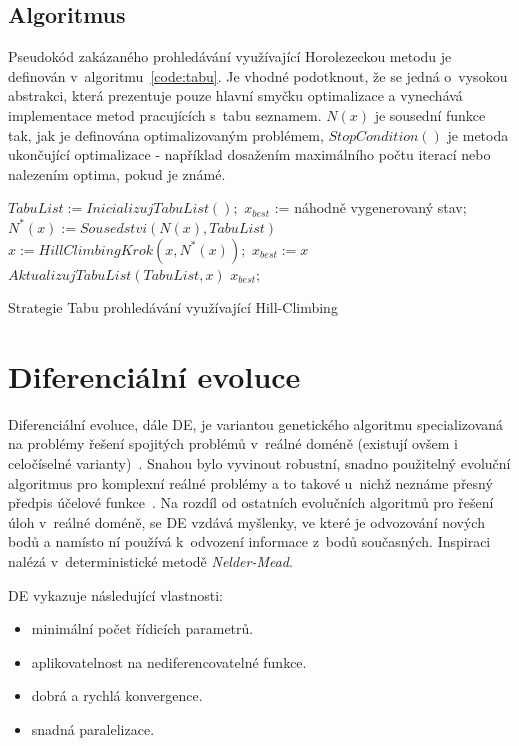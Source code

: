\subsection{Algoritmus}
Pseudokód zakázaného prohledávání využívající Horolezeckou metodu je definován v~algoritmu~\ref{code:tabu}. Je vhodné podotknout, že se jedná o~vysokou abstrakci, která prezentuje pouze hlavní smyčku optimalizace a vynechává implementace metod pracujících s~tabu seznamem. $N(x)$ je sousední funkce tak, jak je definována optimalizovaným problémem, $StopCondition()$ je metoda ukončující optimalizace - například dosažením maximálního počtu iterací nebo nalezením optima, pokud je známé.
\begin{algorithm}[H]
\begin{algorithmic}
\State $TabuList := InicializujTabuList();$ 
\State $x_{best}$ := náhodně vygenerovaný stav;
    \State $N^*(x) := Sousedstvi(N(x), TabuList)$
 	\State $x := HillClimbingKrok(x, N^*(x));$
 	\State $x_{best} := x$
 	\EndIf
 	\State $AktualizujTabuList(TabuList, x)$
\EndWhile
\State \Return $x_{best};$
\end{algorithmic}
\caption{Strategie Tabu prohledávání využívající Hill-Climbing}
\label{code:tabu}
\end{algorithm}


\section{Diferenciální evoluce}
\label{algs:de}
Diferenciální evoluce, dále DE, je variantou genetického algoritmu specializovaná na problémy řešení spojitých problémů v~reálné doméně (existují ovšem i celočíselné varianty)~\cite{Weisser2010}. Snahou bylo vyvinout robustní, snadno použitelný evoluční algoritmus pro komplexní reálné problémy a to takové u~nichž neznáme přesný předpis účelové funkce~\cite{EVO}. Na rozdíl od ostatních evolučních algoritmů pro řešení úloh v~reálné doméně, se DE vzdává myšlenky, ve které je odvozování nových bodů  a namísto ní používá k~odvození informace z~bodů současných. Inspiraci nalézá v~deterministické metodě \textit{Nelder-Mead}.

DE vykazuje následující vlastnosti:
\begin{itemize}
    \item minimální počet řídicích parametrů.
    \item aplikovatelnost na nediferencovatelné funkce.
    \item dobrá a rychlá konvergence.
    \item snadná paralelizace.
\end{itemize}

